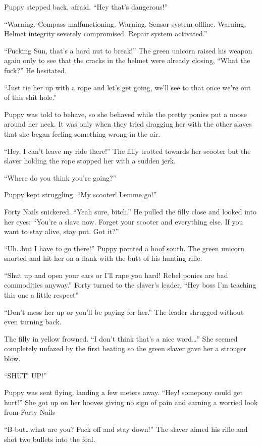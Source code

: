 Puppy stepped back, afraid. ``Hey that's dangerous!''

``{\mt Warning. Compass malfunctioning. Warning. Sensor system offline. Warning. Helmet integrity severely compromised. Repair system activated.}''

``Fucking Sun, that's a hard nut to break!'' The green unicorn raised his weapon again only to see that the cracks in the helmet were already closing, ``What the fuck?'' He hesitated.

``Just tie her up with a rope and let's get going, we'll see to that once we're out of this shit hole.''

Puppy was told to behave, so she behaved while the pretty ponies put a noose around her neck. It was only when they tried dragging her with the other slaves that she began feeling something wrong in the air.

``Hey, I can't leave my ride there!'' The filly trotted towards her scooter but the slaver holding the rope stopped her with a sudden jerk.

``Where do you think you're going?''

Puppy kept struggling. ``My scooter! Lemme go!''

Forty Nails snickered. ``Yeah sure, bitch.'' He pulled the filly close and looked into her eyes: ``You're a slave now. Forget your scooter and everything else. If you want to stay alive, stay put. Got it?''

``Uh\dots but I have to go there!'' Puppy pointed a hoof south. The green unicorn snorted and hit her on a flank with the butt of his hunting rifle.

``Shut up and open your ears or I'll rape you hard! Rebel ponies are bad commodities anyway.'' Forty turned to the slaver's leader, ``Hey boss I'm teaching this one a little respect''

``Don't mess her up or you'll be paying for her.'' The leader shrugged without even turning back.

The filly in yellow frowned. ``I don't think that's a nice word\dots'' She seemed completely unfazed by the first beating so the green slaver gave her a stronger blow.

``SHUT! UP!''

Puppy was sent flying, landing a few meters away. ``Hey! somepony could get hurt!'' She got up on her hooves giving no sign of pain and earning a worried look from Forty Nails

``B-but\dots what are you? Fuck off and stay down!'' The slaver aimed his rifle and shot two bullets into the foal.

